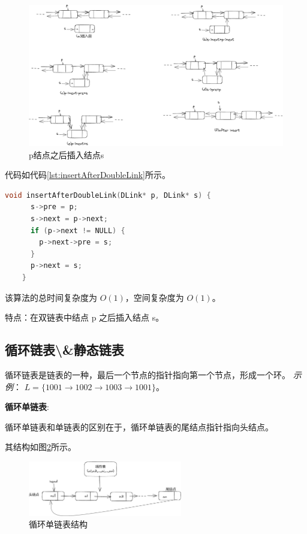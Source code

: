 \documentclass[lang=cn,newtx,10pt,scheme=chinese]{elegantbook}
\begin{document}
  \begin{figure}[h]
    \centering
    \includegraphics[width=1\textwidth]{./figure/pdf/cropped/insertDL.pdf}
    \caption{p结点之后插入结点s}
    \label{fig:insertAfterDoubleLink}
  \end{figure}
  代码如代码\ref{lst:insertAfterDoubleLink}所示。

  \begin{lstlisting}[language=C++, caption={p结点之后插入结点s示例代码}, label={lst:insertAfterDoubleLink}]
    void insertAfterDoubleLink(DLink* p, DLink* s) {
      s->pre = p;
      s->next = p->next;
      if (p->next != NULL) {
        p->next->pre = s;
      }
      p->next = s;
    }
  \end{lstlisting}

  该算法的总时间复杂度为 $O(1)$，空间复杂度为 $O(1)$。

  特点：在双链表中结点 p 之后插入结点 s。



  \subsection{循环链表\textbackslash\&静态链表}
  循环链表是链表的一种，最后一个节点的指针指向第一个节点，形成一个环。
  \textit{示例}：
  $L = \{1001 \rightarrow 1002 \rightarrow 1003 \rightarrow 1001\}$。

  \textbf{循环单链表}:

  循环单链表和单链表的区别在于，循环单链表的尾结点指针指向头结点。

  其结构如图\ref{fig:cycleSingleLink}所示。

  \begin{figure}[h]
    \centering
    \includegraphics[width=0.6\textwidth]{./figure/pdf/cropped/cycleSLink.pdf}
    \caption{循环单链表结构}
    \label{fig:cycleSingleLink}
  \end{figure}
\end{document}
